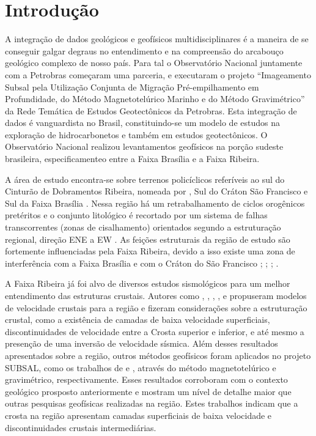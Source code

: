 \chapter{Introdução}

A integração de dados geológicos e geofísicos multidisciplinares é a maneira de se conseguir galgar degraus no entendimento e na compreensão do arcabouço geológico complexo de nosso país. Para tal o Observatório Nacional juntamente com a Petrobras começaram uma parceria, e executaram o projeto “Imageamento Subsal pela Utilização Conjunta de Migração Pré-empilhamento em Profundidade, do Método Magnetotelúrico Marinho e do Método Gravimétrico” da Rede Temática de Estudos Geotectônicos da Petrobras. Esta integração de dados é vanguardista no Brasil, constituindo-se um modelo de estudos na exploração de hidrocarbonetos e também em estudos geotectônicos. O Observatório Nacional realizou levantamentos geofísicos na porção sudeste brasileira, especificamenteo entre a Faixa Brasília e a Faixa Ribeira. 

A área de estudo encontra-se sobre terrenos policíclicos referíveis ao sul do Cinturão de Dobramentos Ribeira, nomeada por \cite{Riccomini_1989}, Sul do Cráton São Francisco e Sul da Faixa Brasília \citep{Almeida_Carneiro_1998}. Nessa região há um retrabalhamento de ciclos orogênicos pretéritos e o conjunto litológico é recortado por um sistema de falhas transcorrentes (zonas de cisalhamento) orientados segundo a estruturação regional, direção ENE a EW  \citep{Hasui_Sadowski_1976}. As feições estruturais da região de estudo são fortemente influenciadas pela Faixa Ribeira, devido a isso existe uma zona de interferência com a Faixa Brasília e com o Cráton do São Francisco \citep{kuhn_metamorphic_2004}; \citep{heilbron_evolution_2010}; \citep{valeriano_u_pb_2011}; \citep{heilbron_serra_2013}.

A Faixa Ribeira já foi alvo de diversos estudos sismológicos para um melhor entendimento das estruturas crustais. Autores como \cite{Bassini_1986}, \cite{souza_crustal_1991}, \cite{souza_shear-wave_1995}, \cite{assumpcao_crustal_2002}, \cite{dias_cario_crustal_2006} e \cite{sand_franca_crustal_2004} propuseram modelos de velocidade crustais para a região e fizeram considerações sobre a estruturação crustal, como a existência de camadas de baixa velocidade superficiais, discontinuidades de velocidade entre a Crosta superior e inferior, e até mesmo a presenção de uma inversão de velocidade sísmica. Além desses resultados apresentados sobre a região, outros métodos geofísicos foram aplicados no projeto SUBSAL, como os trabalhos de \cite{flora_solon_ancient_2013} e \cite{Silva_2014}, através do método magnetotelúrico e gravimétrico, respectivamente. Esses resultados corroboram com o contexto geológico prosposto anteriormente e mostram um nível de detalhe maior que outras pesquisas geofísicas realizadas na região. Estes trabalhos indicam que a crosta na região apresentam camadas superficiais de baixa velocidade e discontinuidades crustais intermediárias.

